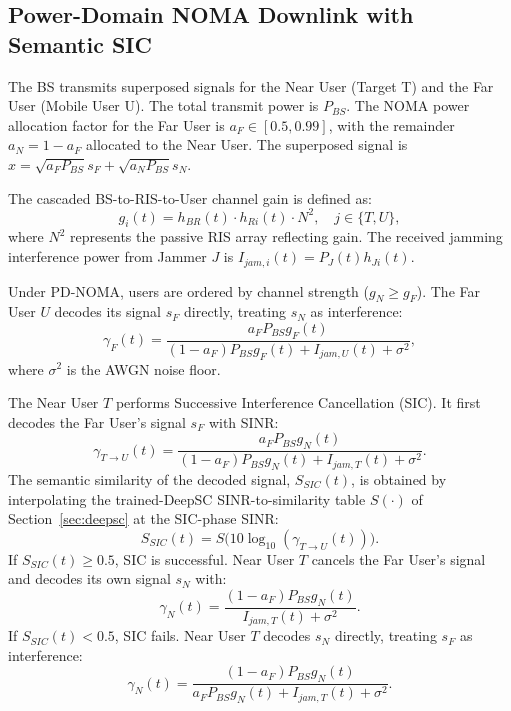 \documentclass[journal,onecolumn]{IEEEtran}
\begin{document}
\subsection{Power-Domain NOMA Downlink with Semantic SIC}
The BS transmits superposed signals for the Near User (Target T) and the Far User (Mobile User U). The total transmit power is $P_{BS}$. The NOMA power allocation factor for the Far User is $a_F \in [0.5, 0.99]$, with the remainder $a_N = 1 - a_F$ allocated to the Near User. The superposed signal is $x = \sqrt{a_F P_{BS}} s_F + \sqrt{a_N P_{BS}} s_N$.

The cascaded BS-to-RIS-to-User channel gain is defined as:
\begin{equation}
    g_i(t) = h_{BR}(t) \cdot h_{Ri}(t) \cdot N^2, \quad j \in \{T, U\},
\end{equation}
where $N^2$ represents the passive RIS array reflecting gain. The received jamming interference power from Jammer $J$ is $I_{jam, i}(t) = P_J(t) h_{Ji}(t)$.

Under PD-NOMA, users are ordered by channel strength ($g_N \ge g_F$). The Far User $U$ decodes its signal $s_F$ directly, treating $s_N$ as interference:
\begin{equation}
    \gamma_F(t) = \frac{a_F P_{BS} g_F(t)}{(1 - a_F) P_{BS} g_F(t) + I_{jam, U}(t) + \sigma^2},
\end{equation}
where $\sigma^2$ is the AWGN noise floor.

The Near User $T$ performs Successive Interference Cancellation (SIC). It first decodes the Far User's signal $s_F$ with SINR:
\begin{equation}
    \gamma_{T \to U}(t) = \frac{a_F P_{BS} g_N(t)}{(1 - a_F) P_{BS} g_N(t) + I_{jam, T}(t) + \sigma^2}.
\end{equation}
The semantic similarity of the decoded signal, $S_{SIC}(t)$, is obtained by interpolating the trained-DeepSC SINR-to-similarity table $S(\cdot)$ of Section~\ref{sec:deepsc} at the SIC-phase SINR:
\begin{equation}
    S_{SIC}(t) = S\big(10\log_{10}(\gamma_{T \to U}(t))\big).
\end{equation}
If $S_{SIC}(t) \ge 0.5$, SIC is successful. Near User $T$ cancels the Far User's signal and decodes its own signal $s_N$ with:
\begin{equation}
    \gamma_N(t) = \frac{(1 - a_F) P_{BS} g_N(t)}{I_{jam, T}(t) + \sigma^2}.
\end{equation}
If $S_{SIC}(t) < 0.5$, SIC fails. Near User $T$ decodes $s_N$ directly, treating $s_F$ as interference:
\begin{equation}
    \gamma_N(t) = \frac{(1 - a_F) P_{BS} g_N(t)}{a_F P_{BS} g_N(t) + I_{jam, T}(t) + \sigma^2}.
\end{equation}
\end{document}
